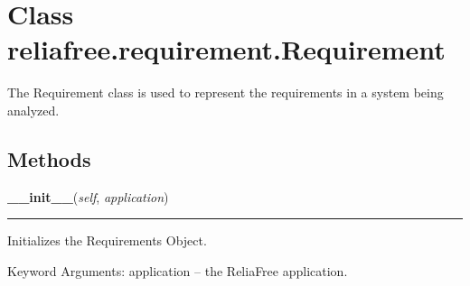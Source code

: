 %
%
%


\section{Class reliafree.requirement.Requirement}

    \label{reliafree:requirement:Requirement}
The Requirement class is used to represent the requirements in a system 
being analyzed.



  \subsection{Methods}

    \label{reliafree:requirement:Requirement:__init__}

    \vspace{0.5ex}

\hspace{.8\funcindent}\begin{boxedminipage}{\funcwidth}

    \raggedright \textbf{\_\_init\_\_}(\textit{self}, \textit{application})

    \vspace{-1.5ex}

    \rule{\textwidth}{0.5\fboxrule}
\setlength{\parskip}{2ex}
    Initializes the Requirements Object.

    Keyword Arguments: application -- the ReliaFree application.

\setlength{\parskip}{1ex}
    \end{boxedminipage}

